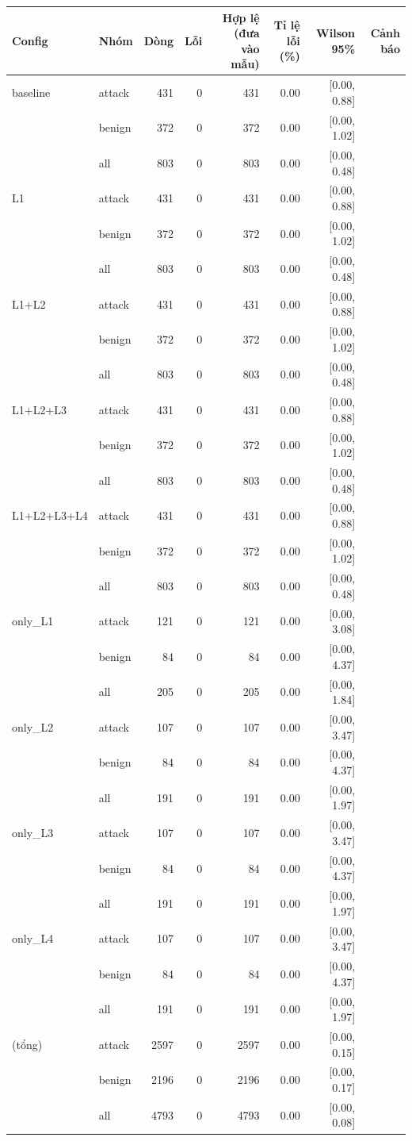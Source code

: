 \begin{tabular}{llrrrrrr}
\toprule
Config & Nhóm & Dòng & Lỗi & Hợp lệ (đưa vào mẫu) & Tỉ lệ lỗi (\%) & Wilson 95\% & Cảnh báo \\
\midrule
baseline & attack & 431 & 0 & 431 & 0.00 & [0.00, 0.88] &  \\
 & benign & 372 & 0 & 372 & 0.00 & [0.00, 1.02] &  \\
 & all & 803 & 0 & 803 & 0.00 & [0.00, 0.48] &  \\
\midrule
L1 & attack & 431 & 0 & 431 & 0.00 & [0.00, 0.88] &  \\
 & benign & 372 & 0 & 372 & 0.00 & [0.00, 1.02] &  \\
 & all & 803 & 0 & 803 & 0.00 & [0.00, 0.48] &  \\
\midrule
L1+L2 & attack & 431 & 0 & 431 & 0.00 & [0.00, 0.88] &  \\
 & benign & 372 & 0 & 372 & 0.00 & [0.00, 1.02] &  \\
 & all & 803 & 0 & 803 & 0.00 & [0.00, 0.48] &  \\
\midrule
L1+L2+L3 & attack & 431 & 0 & 431 & 0.00 & [0.00, 0.88] &  \\
 & benign & 372 & 0 & 372 & 0.00 & [0.00, 1.02] &  \\
 & all & 803 & 0 & 803 & 0.00 & [0.00, 0.48] &  \\
\midrule
L1+L2+L3+L4 & attack & 431 & 0 & 431 & 0.00 & [0.00, 0.88] &  \\
 & benign & 372 & 0 & 372 & 0.00 & [0.00, 1.02] &  \\
 & all & 803 & 0 & 803 & 0.00 & [0.00, 0.48] &  \\
\midrule
only\_L1 & attack & 121 & 0 & 121 & 0.00 & [0.00, 3.08] &  \\
 & benign & 84 & 0 & 84 & 0.00 & [0.00, 4.37] &  \\
 & all & 205 & 0 & 205 & 0.00 & [0.00, 1.84] &  \\
\midrule
only\_L2 & attack & 107 & 0 & 107 & 0.00 & [0.00, 3.47] &  \\
 & benign & 84 & 0 & 84 & 0.00 & [0.00, 4.37] &  \\
 & all & 191 & 0 & 191 & 0.00 & [0.00, 1.97] &  \\
\midrule
only\_L3 & attack & 107 & 0 & 107 & 0.00 & [0.00, 3.47] &  \\
 & benign & 84 & 0 & 84 & 0.00 & [0.00, 4.37] &  \\
 & all & 191 & 0 & 191 & 0.00 & [0.00, 1.97] &  \\
\midrule
only\_L4 & attack & 107 & 0 & 107 & 0.00 & [0.00, 3.47] &  \\
 & benign & 84 & 0 & 84 & 0.00 & [0.00, 4.37] &  \\
 & all & 191 & 0 & 191 & 0.00 & [0.00, 1.97] &  \\
\midrule
(tổng) & attack & 2597 & 0 & 2597 & 0.00 & [0.00, 0.15] &  \\
 & benign & 2196 & 0 & 2196 & 0.00 & [0.00, 0.17] &  \\
 & all & 4793 & 0 & 4793 & 0.00 & [0.00, 0.08] &  \\
\bottomrule
\end{tabular}
